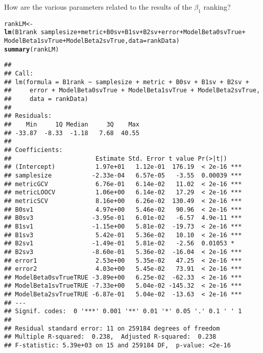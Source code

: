 \documentclass{article}\usepackage[]{graphicx}\usepackage[]{color}
\makeatletter
\newcommand{\hlopt}[1]{\textcolor[rgb]{0,0,0}{#1}}%
\newcommand{\hlstd}[1]{\textcolor[rgb]{0.345,0.345,0.345}{#1}}%
\newcommand{\hlkwb}[1]{\textcolor[rgb]{0.69,0.353,0.396}{#1}}%
\newcommand{\hlkwc}[1]{\textcolor[rgb]{0.333,0.667,0.333}{#1}}%
\newcommand{\hlkwd}[1]{\textcolor[rgb]{0.737,0.353,0.396}{\textbf{#1}}}%
\newenvironment{kframe}{%
 \def\at@end@of@kframe{}%
 \ifinner\ifhmode%
  \def\at@end@of@kframe{\end{minipage}}%
  \begin{minipage}{\columnwidth}%
 \fi\fi%
 \def\FrameCommand##1{\hskip\@totalleftmargin \hskip-\fboxsep
 \colorbox{shadecolor}{##1}\hskip-\fboxsep
     \hskip-\linewidth \hskip-\@totalleftmargin \hskip\columnwidth}%
 \MakeFramed {\advance\hsize-\width
   \@totalleftmargin\z@ \linewidth\hsize
   \@setminipage}}%
 {\par\unskip\endMakeFramed%
 \at@end@of@kframe}
\newenvironment{knitrout}{}{} %
\makeatother
\begin{document}
How are the various parameters related to the results of the $\beta _1$ ranking?
\begin{knitrout}
\color{fgcolor}\begin{kframe}
\begin{alltt}
\hlstd{rankLM} \hlkwb{<-} \hlkwd{lm}\hlstd{(B1rank} \hlopt{~} \hlstd{samplesize} \hlopt{+} \hlstd{metric} \hlopt{+} \hlstd{B0sv} \hlopt{+} \hlstd{B1sv} \hlopt{+} \hlstd{B2sv} \hlopt{+} \hlstd{error} \hlopt{+} \hlstd{ModelBeta0svTrue} \hlopt{+}
    \hlstd{ModelBeta1svTrue} \hlopt{+} \hlstd{ModelBeta2svTrue,} \hlkwc{data} \hlstd{= rankData)}
\hlkwd{summary}\hlstd{(rankLM)}
\end{alltt}
\begin{verbatim}
## 
## Call:
## lm(formula = B1rank ~ samplesize + metric + B0sv + B1sv + B2sv + 
##     error + ModelBeta0svTrue + ModelBeta1svTrue + ModelBeta2svTrue, 
##     data = rankData)
## 
## Residuals:
##    Min     1Q Median     3Q    Max 
## -33.87  -8.33  -1.18   7.68  40.55 
## 
## Coefficients:
##                       Estimate Std. Error t value Pr(>|t|)    
## (Intercept)           1.97e+01   1.12e-01  176.19  < 2e-16 ***
## samplesize           -2.33e-04   6.57e-05   -3.55  0.00039 ***
## metricGCV             6.76e-01   6.14e-02   11.02  < 2e-16 ***
## metricLOOCV           1.06e+00   6.14e-02   17.29  < 2e-16 ***
## metricSCV             8.16e+00   6.26e-02  130.49  < 2e-16 ***
## B0sv1                 4.97e+00   5.46e-02   90.96  < 2e-16 ***
## B0sv3                -3.95e-01   6.01e-02   -6.57  4.9e-11 ***
## B1sv1                -1.15e+00   5.81e-02  -19.73  < 2e-16 ***
## B1sv3                 5.42e-01   5.36e-02   10.10  < 2e-16 ***
## B2sv1                -1.49e-01   5.81e-02   -2.56  0.01053 *  
## B2sv3                -8.60e-01   5.36e-02  -16.04  < 2e-16 ***
## error1                2.53e+00   5.35e-02   47.25  < 2e-16 ***
## error2                4.03e+00   5.45e-02   73.91  < 2e-16 ***
## ModelBeta0svTrueTRUE -3.89e+00   6.25e-02  -62.33  < 2e-16 ***
## ModelBeta1svTrueTRUE -7.33e+00   5.04e-02 -145.32  < 2e-16 ***
## ModelBeta2svTrueTRUE -6.87e-01   5.04e-02  -13.63  < 2e-16 ***
## ---
## Signif. codes:  0 '***' 0.001 '**' 0.01 '*' 0.05 '.' 0.1 ' ' 1
## 
## Residual standard error: 11 on 259184 degrees of freedom
## Multiple R-squared:  0.238,	Adjusted R-squared:  0.238 
## F-statistic: 5.39e+03 on 15 and 259184 DF,  p-value: <2e-16
\end{verbatim}
\end{kframe}
\end{knitrout}
\end{document}
